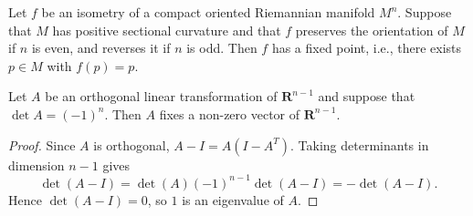 \begin{theorem}
  \label{thm:dc-ch9-3-7}
  Let $f$ be an isometry of a compact oriented Riemannian manifold $M^n$. Suppose
  that $M$ has positive sectional curvature and that $f$ preserves the orientation of
  $M$ if $n$ is even, and reverses it if $n$ is odd. Then $f$ has a fixed point, i.e.,
  there exists $p\in M$ with $f(p)=p$.
\end{theorem}
\begin{lemma}
  \label{lem:dc-ch9-3-8}
  \leanok
  Let $A$ be an orthogonal linear transformation of $\mathbf{R}^{n-1}$ and suppose
  that $\det A=(-1)^n$. Then $A$ fixes a non-zero vector of
  $\mathbf{R}^{n-1}$.
\end{lemma}
\begin{proof}
  \leanok
  \sketch
  Since $A$ is orthogonal, $A-I=A(I-A^{T})$. Taking determinants in dimension
  $n-1$ gives
  $$
  \det(A-I)=\det(A)(-1)^{n-1}\det(A-I)=-\det(A-I).
  $$
  Hence $\det(A-I)=0$, so $1$ is an eigenvalue of $A$.
\end{proof}
